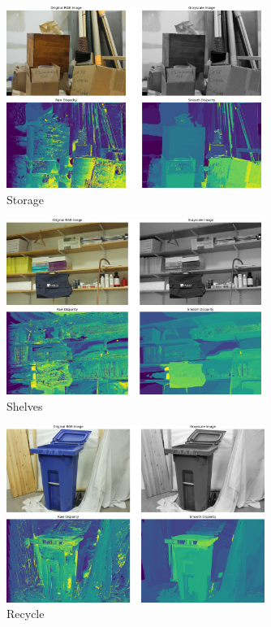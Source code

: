 \documentclass[12pt]{article}
\begin{document}
\begin{figure}[h]
    \centering
    \includegraphics[width=0.74\textwidth]{storage.png} %
    \caption*{Storage} %
\end{figure}
\vspace{3cm}
\begin{figure}[h]
    \centering
    \includegraphics[width=0.74\textwidth]{shelves.png} %
    \caption*{Shelves} %
\end{figure}

\begin{figure}[h]
    \centering
    \includegraphics[width=0.75\textwidth]{recycle.png} %
    \caption*{Recycle} %
\end{figure}
\end{document}
